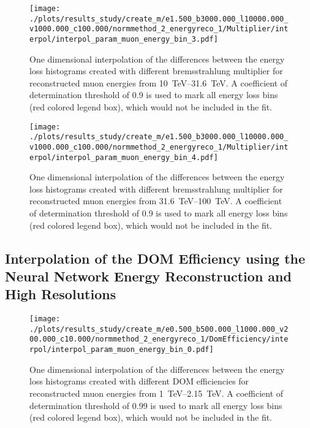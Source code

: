 \begin{figure}[H]
    \centering
    \texttt{[image: ./plots/results\_study/create\_m/e1.500\_b3000.000\_l10000.000\_v1000.000\_c100.000/normmethod\_2\_energyreco\_1/Multiplier/interpol/interpol\_param\_muon\_energy\_bin\_3.pdf]}
    \caption{One dimensional interpolation of the differences between the energy loss histograms created with different bremsstrahlung multiplier for reconstructed muon energies from \SIrange{10}{31.6}{TeV}. A coefficient of determination threshold of \num{0.9} is used to mark all energy loss bins (red colored legend box), which would not be included in the fit.}
    \label{fig:study_1d_interpol_mu3_nn_low}
\end{figure}

\begin{figure}[H]
    \centering
    \texttt{[image: ./plots/results\_study/create\_m/e1.500\_b3000.000\_l10000.000\_v1000.000\_c100.000/normmethod\_2\_energyreco\_1/Multiplier/interpol/interpol\_param\_muon\_energy\_bin\_4.pdf]}
    \caption{One dimensional interpolation of the differences between the energy loss histograms created with different bremsstrahlung multiplier for reconstructed muon energies from \SIrange{31.6}{100}{TeV}. A coefficient of determination threshold of \num{0.9} is used to mark all energy loss bins (red colored legend box), which would not be included in the fit.}
    \label{fig:study_1d_interpol_mu4_nn_low}
\end{figure}

%

\subsection{Interpolation of the DOM Efficiency using the Neural Network Energy Reconstruction and High Resolutions}

\begin{figure}[H]
    \centering
    \texttt{[image: ./plots/results\_study/create\_m/e0.500\_b500.000\_l1000.000\_v200.000\_c10.000/normmethod\_2\_energyreco\_1/DomEfficiency/interpol/interpol\_param\_muon\_energy\_bin\_0.pdf]}
    \caption{One dimensional interpolation of the differences between the energy loss histograms created with different DOM efficiencies for reconstructed muon energies from \SIrange{1}{2.15}{TeV}. A coefficient of determination threshold of \num{0.99} is used to mark all energy loss bins (red colored legend box), which would not be included in the fit.}
    \label{fig:study_1d_interpol_mu0_nn_high_eff}
\end{figure}


